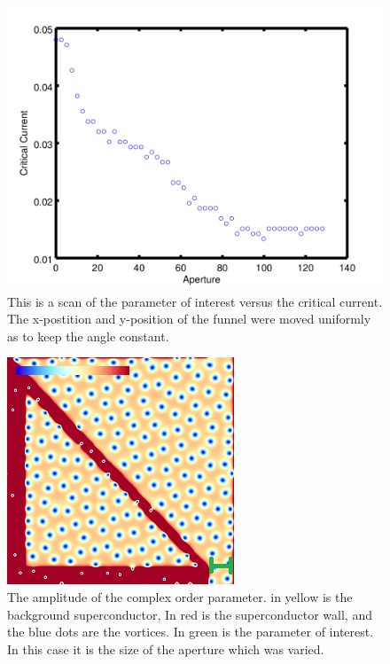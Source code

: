 \begin{figure}[htbp]
\begin{center}
\includegraphics[scale=.50]{constantAngle.png}
\caption{ This is a scan of the parameter of interest versus the critical current. The x-postition and y-position of the funnel were moved uniformly as to keep the angle constant. }
\label{constantAngle}
\end{center}
\end{figure}


\begin{figure}[htbp]
\begin{center}
\includegraphics[scale=.50]{oneSidedDone.png}
\caption{ The amplitude of the complex order parameter. in yellow is the background superconductor, In red is the superconductor wall, and the blue dots are the vortices. In green is the parameter of interest. In this case it is the size of the aperture which was varied. }
\label{oneSidedX}
\end{center}
\end{figure}


